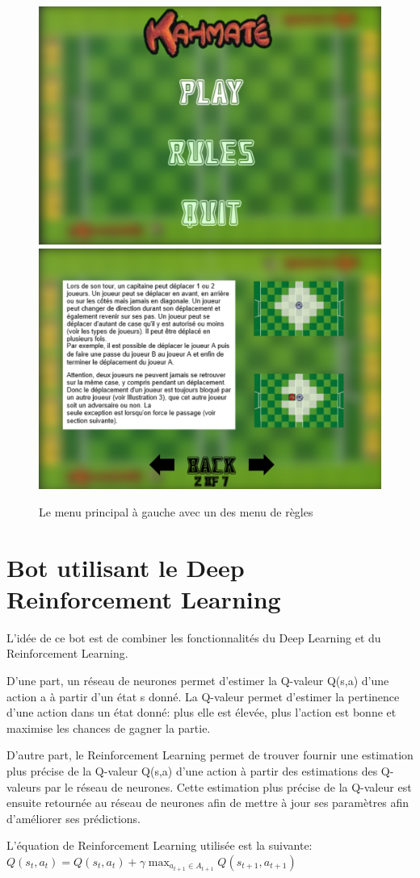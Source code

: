 \documentclass[a4paper,12pt]{article}
\begin{document}
\begin{figure}[h!]
  \centering
  \includegraphics[width=0.45\linewidth]{main_menu_1.png}
  \includegraphics[width=0.45\linewidth]{main_menu_2.png}
  \caption{Le menu principal à gauche avec un des menu de règles}
\end{figure}

\section{Bot utilisant le Deep Reinforcement Learning}

L'idée de ce bot est de combiner les fonctionnalités du Deep Learning et du Reinforcement Learning.


D'une part, un réseau de neurones permet d'estimer la Q-valeur Q(s,a) d'une action a à partir d'un état s donné. La Q-valeur permet d'estimer la pertinence d'une action dans un état donné: plus elle est élevée, plus l'action est bonne et maximise les chances de gagner la partie.


D'autre part, le Reinforcement Learning permet de trouver fournir une estimation plus précise de la Q-valeur Q(s,a) d'une action à partir des estimations des Q-valeurs par le réseau de neurones. Cette estimation plus précise de la Q-valeur est ensuite retournée au réseau de neurones afin de mettre à jour ses paramètres afin d'améliorer ses prédictions.

L'équation de Reinforcement Learning utilisée est la suivante:\\

$Q(s_{t},a_{t}) = Q(s_{t},a_{t}) + \gamma \max_{a_{t+1} \in A_{t+1}} Q(s_{t+1},a_{t+1})$
\newline
\end{document}
